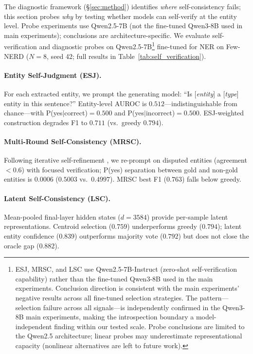 The diagnostic framework (\S\ref{sec:method}) identifies \textit{where} self-consistency fails; this section probes \textit{why} by testing whether models can self-verify at the entity level.
Probe experiments use Qwen2.5-7B (not the fine-tuned Qwen3-8B used in main experiments); conclusions are architecture-specific.
We evaluate self-verification and diagnostic probes on Qwen2.5-7B\footnote{ESJ, MRSC, and LSC use Qwen2.5-7B-Instruct (zero-shot self-verification capability) rather than the fine-tuned Qwen3-8B used in the main experiments. Conclusion direction is consistent with the main experiments' negative results across all fine-tuned selection strategies. The pattern---selection failure across all signals---is independently confirmed in the Qwen3-8B main experiments, making the introspection boundary a model-independent finding within our tested scale. Probe conclusions are limited to the Qwen2.5 architecture; linear probes may underestimate representational capacity (nonlinear alternatives are left to future work).} fine-tuned for NER on Few-NERD ($N{=}8$, seed 42; full results in Table~\ref{tab:self_verification}).

\paragraph{Entity Self-Judgment (ESJ).}
For each extracted entity, we prompt the generating model: ``Is [\textit{entity}] a [\textit{type}] entity in this sentence?''
Entity-level AUROC is $0.512$---indistinguishable from chance---with P(yes$|$correct)${=}0.500$ and P(yes$|$incorrect)${=}0.500$.
ESJ-weighted construction degrades F1 to $0.711$ (vs.\ greedy $0.794$).

\paragraph{Multi-Round Self-Consistency (MRSC).}
Following iterative self-refinement \cite{madaan2023selfrefine}, we re-prompt on disputed entities (agreement ${<}0.6$) with focused verification; P(yes) separation between gold and non-gold entities is $0.0006$ ($0.5003$ vs.\ $0.4997$).
MRSC best F1 ($0.763$) falls below greedy.

\paragraph{Latent Self-Consistency (LSC).}
Mean-pooled final-layer hidden states ($d{=}3584$) provide per-sample latent representations.
Centroid selection ($0.759$) underperforms greedy ($0.794$); latent entity confidence ($0.839$) outperforms majority vote ($0.792$) but does not close the oracle gap ($0.882$).

